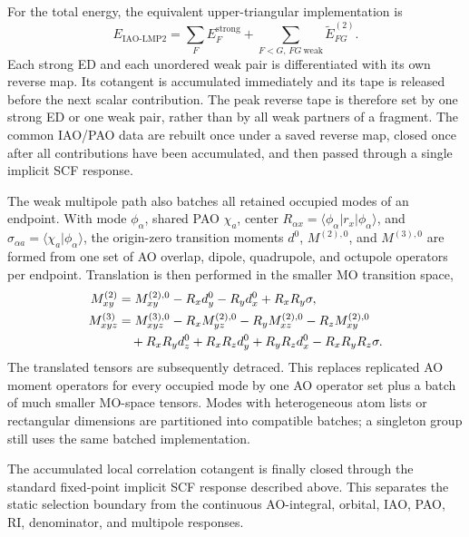 \documentclass[11pt]{article}
\begin{document}
For the total energy, the equivalent upper-triangular implementation is
\begin{equation}
 E_{\mathrm{IAO\mbox{-}LMP2}}
 =\sum_F E_F^{\mathrm{strong}}
 +\sum_{F<G,\,FG\ \mathrm{weak}}\widetilde E_{FG}^{(2)}.
 \label{eq:workflow-local-mp2-upper-triangle}
\end{equation}
Each strong ED and each unordered weak pair is differentiated with its own
reverse map.  Its cotangent is accumulated immediately and its tape is
released before the next scalar contribution.  The peak reverse tape is
therefore set by one strong ED or one weak pair, rather than by all weak
partners of a fragment.  The common IAO/PAO data are rebuilt once under a
saved reverse map, closed once after all contributions have been accumulated,
and then passed through a single implicit SCF response.

The weak multipole path also batches all retained occupied modes of an
endpoint.  With mode $\phi_\alpha$, shared PAO $\chi_a$, center
$R_{\alpha x}=\langle\phi_\alpha|r_x|\phi_\alpha\rangle$, and
$\sigma_{\alpha a}=\langle\chi_a|\phi_\alpha\rangle$, the origin-zero
transition moments $d^0$, $M^{(2),0}$, and $M^{(3),0}$ are formed from one
set of AO overlap, dipole, quadrupole, and octupole operators per endpoint.
Translation is then performed in the smaller MO transition space,
\begin{align}
 M^{(2)}_{xy}
 &=M^{(2),0}_{xy}-R_xd^0_y-R_yd^0_x+R_xR_y\sigma,\\
 M^{(3)}_{xyz}
 &=M^{(3),0}_{xyz}-R_xM^{(2),0}_{yz}-R_yM^{(2),0}_{xz}
   -R_zM^{(2),0}_{xy}\notag\\
 &\quad+R_xR_yd^0_z+R_xR_zd^0_y+R_yR_zd^0_x-R_xR_yR_z\sigma.
 \label{eq:workflow-batched-multipole-translation}
\end{align}
The translated tensors are subsequently detraced.  This replaces replicated
AO moment operators for every occupied mode by one AO operator set plus a
batch of much smaller MO-space tensors.  Modes with heterogeneous atom lists
or rectangular dimensions are partitioned into compatible batches; a
singleton group still uses the same batched implementation.

The accumulated local correlation cotangent is finally closed through the
standard fixed-point implicit SCF response described above.  This separates
the static selection boundary from the continuous AO-integral, orbital, IAO,
PAO, RI, denominator, and multipole responses.
\end{document}
